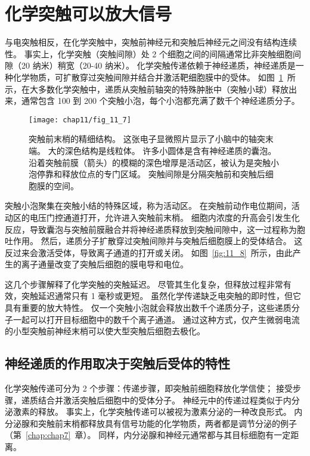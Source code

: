 \section{化学突触可以放大信号}

与电突触相反，在化学突触中，突触前神经元和突触后神经元之间没有结构连续性。
事实上，化学突触（突触间隙）处 2 个细胞之间的间隔通常比非突触细胞间隙（20 纳米）稍宽（20-40 纳米）。
化学突触传递依赖于神经递质，神经递质是一种化学物质，可扩散穿过突触间隙并结合并激活靶细胞膜中的受体。
如图~\ref{fig:11_7}~所示，在大多数化学突触中，递质从突触前轴突的特殊肿胀中（突触小球）释放出来，通常包含 100 到 200 个突触小泡，每个小泡都充满了数千个神经递质分子。


\begin{figure}[htbp]
	\centering
	\texttt{[image: chap11/fig\_11\_7]}
	\caption{突触前末梢的精细结构。
		这张电子显微照片显示了小脑中的轴突末端。
		大的深色结构是线粒体。
		许多小圆体是含有神经递质的囊泡。
		沿着突触前膜（箭头）的模糊的深色增厚是活动区，被认为是突触小泡停靠和释放位点的专门区域。
		突触间隙是分隔突触前和突触后细胞膜的空间。}
	\label{fig:11_7}
\end{figure}


突触小泡聚集在突触小结的特殊区域，称为活动区。
在突触前动作电位期间，活动区的电压门控通道打开，允许进入突触前末梢。
细胞内浓度的升高会引发生化反应，导致囊泡与突触前膜融合并将神经递质释放到突触间隙中，这一过程称为胞吐作用。
然后，递质分子扩散穿过突触间隙并与突触后细胞膜上的受体结合。
这反过来会激活受体，导致离子通道的打开或关闭。
如图~\ref{fig:11_8}~所示，由此产生的离子通量改变了突触后细胞的膜电导和电位。


这几个步骤解释了化学突触的突触延迟。
尽管其生化复杂，但释放过程非常有效，突触延迟通常只有 1 毫秒或更短。
虽然化学传递缺乏电突触的即时性，但它具有重要的放大特性。
仅一个突触小泡就会释放出数千个递质分子，这些递质分子一起可以打开目标细胞中的数千个离子通道。
通过这种方式，仅产生微弱电流的小型突触前神经末梢可以使大型突触后细胞去极化。



\subsection{神经递质的作用取决于突触后受体的特性}

化学突触传递可分为 2 个步骤：传递步骤，即突触前细胞释放化学信使；
接受步骤，递质结合并激活突触后细胞中的受体分子。
神经元中的传递过程类似于内分泌激素的释放。
事实上，化学突触传递可以被视为激素分泌的一种改良形式。
内分泌腺和突触前末梢都释放具有信号功能的化学物质，两者都是调节分泌的例子（第~\ref{chap:chap7}~章）。
同样，内分泌腺和神经元通常都与其目标细胞有一定距离。


